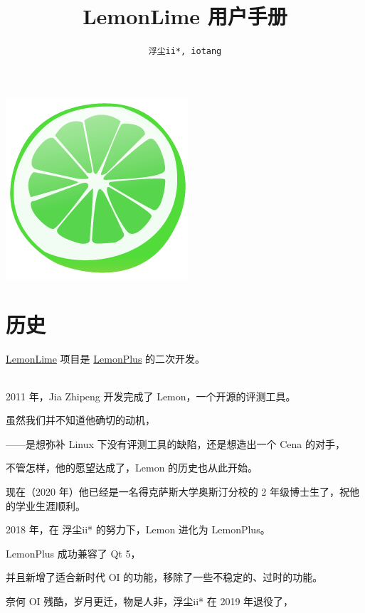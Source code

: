 \documentclass[UTF-8]{ctexart}
\title{\textbf{\huge LemonLime 用户手册}}
\author{\texttt{浮尘ii*, iotang}}
\date{}
\begin{document}
	\maketitle
	
	\begin{center}
	\includegraphics[scale=0.5]{pics/icon.png}
	\end{center}
	\newpage
	
	\tableofcontents
	
	\newpage	
	
	\section{历史}
	
		\href{https://github.com/iotang/Project_LemonLime}{LemonLime} 项目是 \href{https://github.com/Dust1404/Project_LemonPlus}{LemonPlus} 的二次开发。
	
		~\\
	
		2011 年，Jia Zhipeng 开发完成了 Lemon，一个开源的评测工具。
		
		虽然我们并不知道他确切的动机，
		
		——是想弥补 Linux 下没有评测工具的缺陷，还是想造出一个 Cena 的对手，
		
		不管怎样，他的愿望达成了，Lemon 的历史也从此开始。
		
		现在（2020 年）他已经是一名得克萨斯大学奥斯汀分校的 2 年级博士生了，祝他的学业生涯顺利。\newline
		
		2018 年，在 浮尘ii* 的努力下，Lemon 进化为 LemonPlus。
		
		LemonPlus 成功兼容了 Qt 5，
		
		并且新增了适合新时代 OI 的功能，移除了一些不稳定的、过时的功能。
		
		奈何 OI 残酷，岁月更迁，物是人非，浮尘ii* 在 2019 年退役了，
		
\end{document}
